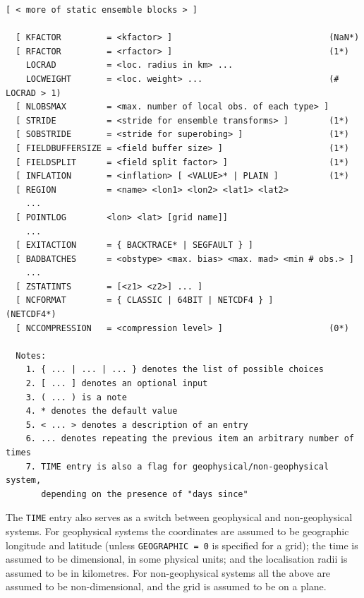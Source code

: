 \documentclass[11pt]{report}
\begin{document}
\begin{Verbatim}[frame=single,fontsize=\footnotesize]
    [ < more of static ensemble blocks > ]

  [ KFACTOR         = <kfactor> ]                               (NaN*)
  [ RFACTOR         = <rfactor> ]                               (1*)
    LOCRAD          = <loc. radius in km> ...
    LOCWEIGHT       = <loc. weight> ...                         (# LOCRAD > 1)
  [ NLOBSMAX        = <max. number of local obs. of each type> ]
  [ STRIDE          = <stride for ensemble transforms> ]        (1*)
  [ SOBSTRIDE       = <stride for superobing> ]                 (1*)
  [ FIELDBUFFERSIZE = <field buffer size> ]                     (1*)
  [ FIELDSPLIT      = <field split factor> ]                    (1*)
  [ INFLATION       = <inflation> [ <VALUE>* | PLAIN ]          (1*)
  [ REGION          = <name> <lon1> <lon2> <lat1> <lat2>
    ...
  [ POINTLOG        <lon> <lat> [grid name]]
    ...
  [ EXITACTION      = { BACKTRACE* | SEGFAULT } ]
  [ BADBATCHES      = <obstype> <max. bias> <max. mad> <min # obs.> ]
    ...
  [ ZSTATINTS       = [<z1> <z2>] ... ]
  [ NCFORMAT        = { CLASSIC | 64BIT | NETCDF4 } ]           (NETCDF4*)
  [ NCCOMPRESSION   = <compression level> ]                     (0*)

  Notes:
    1. { ... | ... | ... } denotes the list of possible choices
    2. [ ... ] denotes an optional input
    3. ( ... ) is a note
    4. * denotes the default value
    5. < ... > denotes a description of an entry
    6. ... denotes repeating the previous item an arbitrary number of times
    7. TIME entry is also a flag for geophysical/non-geophysical system,
       depending on the presence of "days since"
\end{Verbatim}
The \verb|TIME| entry also serves as a switch between geophysical and non-geophysical systems.
For geophysical systems the coordinates are assumed to be geographic longitude and latitude (unless \verb|GEOGRAPHIC = 0| is specified for a grid); the time is assumed to be dimensional, in some physical units; and the localisation radii is assumed to be in kilometres.
For non-geophysical systems all the above are assumed to be non-dimensional, and the grid is assumed to be on a plane.
\end{document}
